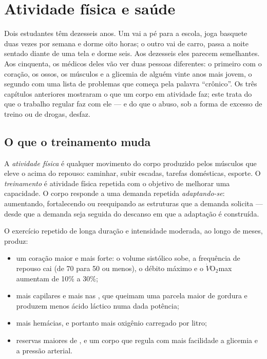 \chapter{Atividade física e saúde}\label{ch:g10:sport-and-health}

Dois estudantes têm dezesseis anos. Um vai a pé para a escola, joga
basquete duas vezes por semana e dorme oito horas; o outro vai de
carro, passa a noite sentado diante de uma tela e dorme seis. Aos
dezesseis eles parecem semelhantes. Aos cinquenta, os médicos deles
vão ver duas pessoas diferentes: o primeiro com o coração, os ossos, os
músculos e a glicemia de alguém vinte anos mais jovem, o segundo com
uma lista de problemas que começa pela palavra ``crônico''. Os três
capítulos anteriores mostraram o que um corpo em atividade faz; este
trata do que o trabalho regular faz com ele --- e do que o abuso, sob a
forma de excesso de treino ou de drogas, desfaz.

\section{O que o treinamento muda}

\begin{definition}\label{def:g10:sport-and-health:training}
A \emph{atividade física} é qualquer movimento
do corpo produzido pelos músculos que eleve o  acima do
repouso: caminhar, subir escadas, tarefas domésticas, esporte. O
\emph{treinamento} é atividade física repetida com o objetivo de
melhorar uma capacidade. O corpo responde a uma demanda repetida
\emph{adaptando-se}: aumentando, fortalecendo ou reequipando as
estruturas que a demanda solicita --- desde que a demanda seja seguida
do descanso em que a adaptação é construída.
\end{definition}

\begin{proposition}\label{prop:g10:sport-and-health:endurance}
O exercício repetido de longa duração e intensidade moderada, ao longo
de meses, produz:
\begin{itemize}
  \item um coração maior e mais forte: o volume sistólico sobe, a
        frequência de repouso cai (de 70 para 50 ou menos), o débito
        máximo e o $\dot V\!\mathrm{O_2}$max aumentam de 10\% a 30\%;
  \item mais capilares e mais  nas , que
        queimam uma parcela maior de gordura e produzem menos ácido
        láctico numa dada potência;
  \item mais hemácias, e portanto mais oxigênio carregado por litro;
  \item reservas maiores de , e um corpo que regula com mais
        facilidade a glicemia e a pressão arterial.
\end{itemize}
\end{proposition}
\admitted

